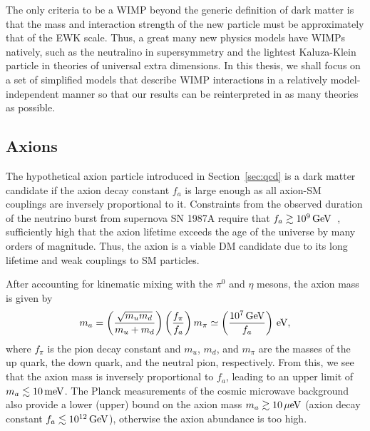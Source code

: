 The only criteria to be a WIMP beyond the generic definition of dark matter is that the mass and interaction strength of the new particle must be approximately that of the EWK scale.
Thus, a great many new physics models have WIMPs natively, such as the neutralino in supersymmetry and the lightest Kaluza-Klein particle in theories of universal extra dimensions.
In this thesis, we shall focus on a set of simplified models that describe WIMP interactions in a relatively model-independent manner so that our results can be reinterpreted in as many theories as possible.

\subsection{Axions}
\label{sec:dm_axion}

The hypothetical axion particle introduced in Section~\ref{sec:qcd} is a dark matter candidate if the axion decay constant $f_a$ is large enough as all axion-SM couplings are inversely proportional to it.
Constraints from the observed duration of the neutrino burst from supernova SN 1987A require that $f_a \gtrsim 10^9\,\text{Ge\hspace{-.08em}V}$~\cite{Raffelt2008}, sufficiently high that the axion lifetime exceeds the age of the universe by many orders of magnitude. 
Thus, the axion is a viable DM candidate due to its long lifetime and weak couplings to SM particles.

After accounting for kinematic mixing with the $\pi^0$ and $\eta$ mesons, the axion mass is given by
\begin{equation}
  m_a = \left(\frac{\sqrt{m_u m_d}}{m_u + m_d}\right) \left(\frac{f_\pi}{f_a}\right) m_\pi \simeq \left( \frac{10^7\,\text{Ge\hspace{-.08em}V}}{f_a}\right) \,\text{e\hspace{-.08em}V},
\end{equation}
where $f_\pi$ is the pion decay constant and $m_u$, $m_d$, and $m_\pi$ are the masses of the up quark, the down quark, and the neutral pion, respectively.
From this, we see that the axion mass is inversely proportional to $f_a$, leading to an upper limit of $m_a \lesssim 10 \,\text{me\hspace{-.08em}V}$.
The Planck measurements of the cosmic microwave background also provide a lower (upper) bound on the axion mass $m_a \gtrsim 10 \,\text{\ensuremath{\mu}e\hspace{-.08em}V}$ (axion decay constant $f_a \lesssim 10^{12}\,\text{Ge\hspace{-.08em}V}$), otherwise the axion abundance is too high.

